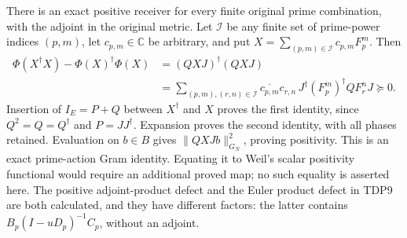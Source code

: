 There is an exact positive receiver for every finite original prime
combination, with the adjoint in the original metric. Let $\mathcal I$
be any finite set of prime-power indices $(p,m)$, let $c_{p,m}\in\mathbb C$
be arbitrary, and put $X=\sum_{(p,m)\in\mathcal I}c_{p,m}F_p^m$. Then
\begin{equation}\tag{TDP28}
\begin{aligned}
\Phi(X^\dagger X)-\Phi(X)^\dagger\Phi(X)
 &=(QXJ)^\dagger(QXJ)\\
 &=\sum_{(p,m),(r,n)\in\mathcal I}
 \overline{c_{p,m}}c_{r,n}\,
 J^\dagger(F_p^m)^\dagger QF_r^nJ\succeq0.
\end{aligned}
\end{equation}
Insertion of $I_E=P+Q$ between $X^\dagger$ and $X$ proves the first
identity, since $Q^2=Q=Q^\dagger$ and $P=JJ^\dagger$. Expansion proves
the second identity, with all phases retained. Evaluation on $b\in B$
gives $\|QXJb\|_{G_N}^2$, proving positivity. This is an exact
prime-action Gram identity. Equating it to Weil's scalar positivity
functional would require an additional proved map; no such equality is
asserted here. The positive adjoint-product defect and the Euler
product defect in TDP9 are both calculated, and they have different
factors: the latter contains $B_p(I-uD_p)^{-1}C_p$, without an adjoint.
